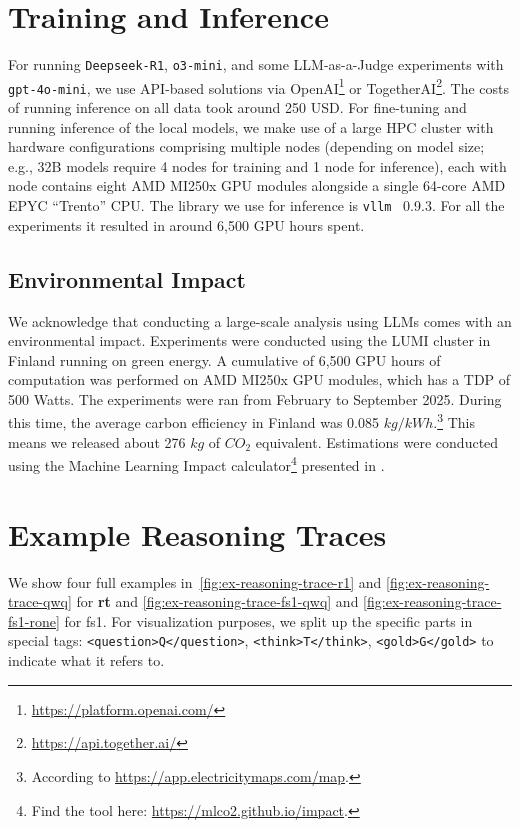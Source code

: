 \documentclass[11pt]{article}
\newcommand{\rone}{\texttt{Deepseek-R1}}
\begin{document}
\section{Training and Inference}\label{app:trainandinference}
For running \rone{}, \texttt{o3-mini}, and some LLM-as-a-Judge experiments with \texttt{gpt-4o-mini}, we use API-based solutions via OpenAI\footnote{\url{https://platform.openai.com/}} or TogetherAI\footnote{\url{https://api.together.ai/}}. The costs of running inference on all data took around 250 USD. For fine-tuning and running inference of the local models, we make use of a large HPC cluster with hardware configurations comprising multiple nodes (depending on model size; e.g., 32B models require 4 nodes for training and 1 node for inference), each with node contains eight AMD MI250x GPU modules alongside a single 64-core AMD EPYC ``Trento'' CPU. The library we use for inference is \texttt{vllm}~\citep{kwon2023efficient} 0.9.3. For all the experiments it resulted in around 6,500 GPU hours spent. 

\subsection{Environmental Impact}
We acknowledge that conducting a large-scale analysis using LLMs comes with an environmental impact. Experiments were conducted using the LUMI cluster in Finland running on green energy. A cumulative of 6,500 GPU hours of computation was performed on AMD MI250x GPU modules, which has a TDP of 500 Watts. The experiments were ran from February to September 2025. During this time, the average carbon efficiency in Finland was 0.085 $kg/kWh$.\footnote{According to \url{https://app.electricitymaps.com/map}.} This means we released about 276 $kg$ of $CO_2$ equivalent. Estimations were conducted using the Machine Learning Impact calculator\footnote{Find the tool here: \url{https://mlco2.github.io/impact}.} presented in \citep{lacoste2019quantifying}.

\section{Example Reasoning Traces}\label{app:example}
We show four full examples in~\cref{fig:ex-reasoning-trace-r1} and \cref{fig:ex-reasoning-trace-qwq} for \textbf{rt} and \cref{fig:ex-reasoning-trace-fs1-qwq} and \cref{fig:ex-reasoning-trace-fs1-rone} for fs1. For visualization purposes, we split up the specific parts in special tags: \verb|<question>Q</question>|, \verb|<think>T</think>|, \verb|<gold>G</gold>| to indicate what it refers to.
\end{document}

